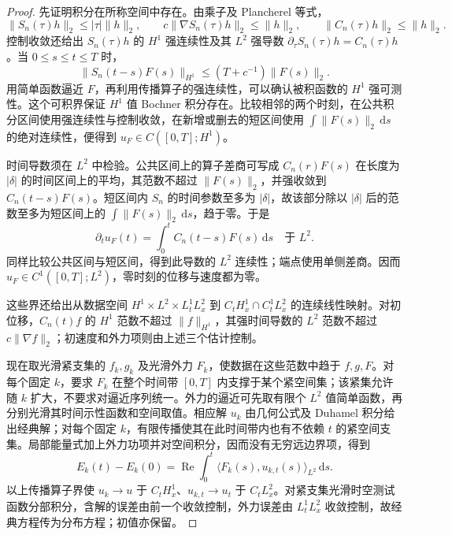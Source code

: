 \begin{proof}
先证明积分在所称空间中存在。由乘子及 Plancherel 等式，
\[
 \|S_n(\tau)h\|_2\leq|\tau|\|h\|_2,\qquad
 c\|\nabla S_n(\tau)h\|_2\leq\|h\|_2,\qquad
 \|C_n(\tau)h\|_2\leq\|h\|_2.
\]
控制收敛还给出 \(S_n(\tau)h\) 的 \(H^1\) 强连续性及其 \(L^2\) 强导数 \(\partial_\tau S_n(\tau)h=C_n(\tau)h\)。当 \(0\leq s\leq t\leq T\) 时，
\[
 \|S_n(t-s)F(s)\|_{H^1}\leq(T+c^{-1})\|F(s)\|_2.
\]
用简单函数逼近 \(F\)，再利用传播算子的强连续性，可以确认被积函数的 \(H^1\) 强可测性。这个可积界保证 \(H^1\) 值 Bochner 积分存在。比较相邻的两个时刻，在公共积分区间使用强连续性与控制收敛，在新增或删去的短区间使用 \(\int\|F(s)\|_2\,\mathrm{d}s\) 的绝对连续性，便得到 \(u_F\in C([0,T];H^1)\)。

时间导数须在 \(L^2\) 中检验。公共区间上的算子差商可写成 \(C_n(r)F(s)\) 在长度为 \(|\delta|\) 的时间区间上的平均，其范数不超过 \(\|F(s)\|_2\)，并强收敛到 \(C_n(t-s)F(s)\)。短区间内 \(S_n\) 的时间参数至多为 \(|\delta|\)，故该部分除以 \(|\delta|\) 后的范数至多为短区间上的 \(\int\|F(s)\|_2\,\mathrm{d}s\)，趋于零。于是
\[
 \partial_tu_F(t)=\int_0^tC_n(t-s)F(s)\,\mathrm{d}s
                 \quad\text{于 }L^2.
\]
同样比较公共区间与短区间，得到此导数的 \(L^2\) 连续性；端点使用单侧差商。因而 \(u_F\in C^1([0,T];L^2)\)，零时刻的位移与速度都为零。

这些界还给出从数据空间 \(H^1\times L^2\times L^1_tL^2_x\) 到 \(C_tH^1_x\cap C_t^1L^2_x\) 的连续线性映射。对初位移，\(C_n(t)f\) 的 \(H^1\) 范数不超过 \(\|f\|_{H^1}\)，其强时间导数的 \(L^2\) 范数不超过 \(c\|\nabla f\|_2\)；初速度和外力项则由上述三个估计控制。

现在取光滑紧支集的 \(f_k,g_k\) 及光滑外力 \(F_k\)，使数据在这些范数中趋于 \(f,g,F\)。对每个固定 \(k\)，要求 \(F_k\) 在整个时间带 \([0,T]\) 内支撑于某个紧空间集；该紧集允许随 \(k\) 扩大，不要求对逼近序列统一。外力的逼近可先取有限个 \(L^2\) 值简单函数，再分别光滑其时间示性函数和空间取值。相应解 \(u_k\) 由几何公式及 Duhamel 积分给出经典解；对每个固定 \(k\)，有限传播使其在此时间带内也有不依赖 \(t\) 的紧空间支集。局部能量式加上外力功项并对空间积分，因而没有无穷远边界项，得到
\[
 E_k(t)-E_k(0)=\operatorname{Re}\int_0^t
               \langle F_k(s),u_{k,t}(s)\rangle_{L^2}\,\mathrm{d}s.
\]
以上传播算子界使 \(u_k\to u\) 于 \(C_tH^1_x\)、\(u_{k,t}\to u_t\) 于 \(C_tL^2_x\)。对紧支集光滑时空测试函数分部积分，含解的误差由前一个收敛控制，外力误差由 \(L^1_tL^2_x\) 收敛控制，故经典方程传为分布方程；初值亦保留。


\end{proof}
